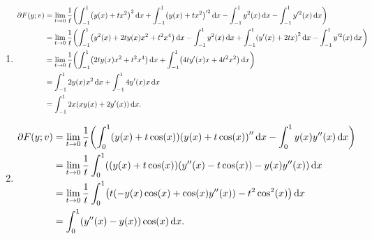 \documentclass{exercise}
\begin{document}
	\begin{enumerate}
		\item
		\begin{align*}
			\partial F\parentheses*{y; v} &= \lim_{t \to 0}\frac{1}{t}\parentheses*{\int_{-1}^1 \parentheses*{y\parentheses*{x} + tx^2}^2 \d x + \int_{-1}^1 \parentheses*{y\parentheses*{x} + tx^2}'^2 \d x - \int_{-1}^1 y^2\parentheses*{x}\d x - \int_{-1}^1 y'^2\parentheses*{x}\d x}\\
			&= \lim_{t \to 0}\frac{1}{t}\parentheses*{\int_{-1}^1 \parentheses*{y^2\parentheses*{x} + 2ty\parentheses*{x}x^2 + t^2 x^4}\d x - \int_{-1}^1 y^2\parentheses*{x}\d x + \int_{-1}^1 \parentheses*{y'\parentheses*{x} + 2tx}^2 \d x - \int_{-1}^1 y'^2\parentheses*{x}\d x}\\
			&= \lim_{t \to 0}\frac{1}{t}\parentheses*{\int_{-1}^1 \parentheses*{2ty\parentheses*{x}x^2 + t^2 x^4}\d x + \int_{-1}^1 \parentheses*{4ty'\parentheses*{x}x + 4t^2 x^2}\d x}\\
			&= \int_{-1}^1 2y\parentheses*{x}x^2 \d x + \int_{-1}^1 4y'\parentheses*{x}x\d x\\
			&= \int_{-1}^1 2x\parentheses*{xy\parentheses*{x} + 2y'\parentheses*{x}}\d x.
		\end{align*}
		\item
		\begin{align*}
			\partial F\parentheses*{y; v} &= \lim_{t \to 0}\frac{1}{t}\parentheses*{\int_0^1 \parentheses*{y\parentheses*{x} + t\cos\parentheses*{x}}\parentheses*{y\parentheses*{x} + t\cos\parentheses*{x}}''\d x - \int_0^1 y\parentheses*{x}y''\parentheses*{x}\d x}\\
			&= \lim_{t \to 0}\frac{1}{t}\int_0^1 \parentheses*{\parentheses*{y\parentheses*{x} + t\cos\parentheses*{x}}\parentheses*{y''\parentheses*{x} - t\cos\parentheses*{x}} - y\parentheses*{x}y''\parentheses*{x}}\d x\\
			&= \lim_{t \to 0}\frac{1}{t}\int_0^1 \parentheses*{t\parentheses*{-y\parentheses*{x}\cos\parentheses*{x} + \cos\parentheses*{x}y''\parentheses*{x}} - t^2 \cos^2\parentheses*{x}}\d x\\
			&= \int_0^1 \parentheses*{y''\parentheses*{x} - y\parentheses*{x}}\cos\parentheses*{x}\d x.
		\end{align*}
	\end{enumerate}


	\section{}
\end{document}
